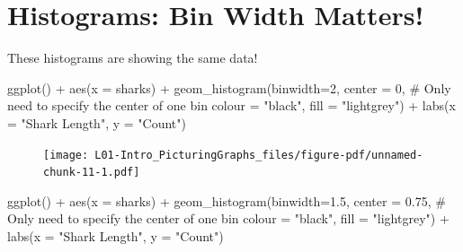 \documentclass[
  letterpaper,
  DIV=11,
  numbers=noendperiod]{scrreprt}
\newenvironment{Shaded}{\begin{snugshade}}{\end{snugshade}}
\newcommand{\AttributeTok}[1]{\textcolor[rgb]{0.40,0.45,0.13}{#1}}
\newcommand{\CommentTok}[1]{\textcolor[rgb]{0.37,0.37,0.37}{#1}}
\newcommand{\DecValTok}[1]{\textcolor[rgb]{0.68,0.00,0.00}{#1}}
\newcommand{\FloatTok}[1]{\textcolor[rgb]{0.68,0.00,0.00}{#1}}
\newcommand{\FunctionTok}[1]{\textcolor[rgb]{0.28,0.35,0.67}{#1}}
\newcommand{\NormalTok}[1]{\textcolor[rgb]{0.00,0.23,0.31}{#1}}
\newcommand{\SpecialCharTok}[1]{\textcolor[rgb]{0.37,0.37,0.37}{#1}}
\newcommand{\StringTok}[1]{\textcolor[rgb]{0.13,0.47,0.30}{#1}}
\begin{document}
\hypertarget{histograms-bin-width-matters}{%
\section{Histograms: Bin Width
Matters!}\label{histograms-bin-width-matters}}

\centering

These histograms are showing the same data!

\raggedright

\begin{Shaded}
\begin{Highlighting}[]
\FunctionTok{ggplot}\NormalTok{() }\SpecialCharTok{+} 
    \FunctionTok{aes}\NormalTok{(}\AttributeTok{x =}\NormalTok{ sharks) }\SpecialCharTok{+}
    \FunctionTok{geom\_histogram}\NormalTok{(}\AttributeTok{binwidth=}\DecValTok{2}\NormalTok{, }
        \AttributeTok{center =} \DecValTok{0}\NormalTok{, }\CommentTok{\# Only need to specify the center of one bin}
        \AttributeTok{colour =} \StringTok{"black"}\NormalTok{, }\AttributeTok{fill =} \StringTok{"lightgrey"}\NormalTok{) }\SpecialCharTok{+}
    \FunctionTok{labs}\NormalTok{(}\AttributeTok{x =} \StringTok{"Shark Length"}\NormalTok{, }\AttributeTok{y =} \StringTok{"Count"}\NormalTok{)}
\end{Highlighting}
\end{Shaded}

\begin{figure}[H]

{\centering \texttt{[image: L01-Intro\_PicturingGraphs\_files/figure-pdf/unnamed-chunk-11-1.pdf]}

}

\end{figure}

\begin{Shaded}
\begin{Highlighting}[]
\FunctionTok{ggplot}\NormalTok{() }\SpecialCharTok{+} 
    \FunctionTok{aes}\NormalTok{(}\AttributeTok{x =}\NormalTok{ sharks) }\SpecialCharTok{+}
    \FunctionTok{geom\_histogram}\NormalTok{(}\AttributeTok{binwidth=}\FloatTok{1.5}\NormalTok{, }
        \AttributeTok{center =} \FloatTok{0.75}\NormalTok{, }\CommentTok{\# Only need to specify the center of one bin}
        \AttributeTok{colour =} \StringTok{"black"}\NormalTok{, }\AttributeTok{fill =} \StringTok{"lightgrey"}\NormalTok{) }\SpecialCharTok{+}
    \FunctionTok{labs}\NormalTok{(}\AttributeTok{x =} \StringTok{"Shark Length"}\NormalTok{, }\AttributeTok{y =} \StringTok{"Count"}\NormalTok{)}
\end{Highlighting}
\end{Shaded}
\end{document}
